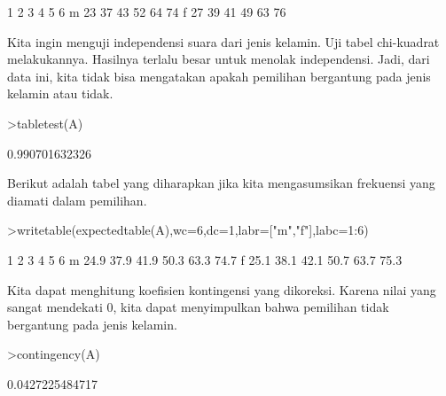 \documentclass[12pt,arial,letterpaper]{book}
\begin{document}
\begin{eulercomment}
\begin{eulercomment}
\begin{eulercomment}
\begin{eulercomment}
\begin{eulercomment}
\begin{eulercomment}
\begin{eulercomment}
\begin{eulercomment}
\begin{eulercomment}
\begin{eulercomment}
\begin{eulercomment}
\begin{eulercomment}
\begin{eulercomment}
\begin{eulercomment}
\begin{eulercomment}
\begin{eulercomment}
\begin{eulercomment}
\begin{eulercomment}
\begin{eulercomment}
\begin{eulercomment}
\begin{eulercomment}
\begin{eulercomment}
\begin{eulercomment}
\begin{eulercomment}
\begin{eulercomment}
\begin{eulercomment}
\begin{eulercomment}
\begin{eulercomment}
\begin{eulercomment}
\begin{eulercomment}
\begin{eulercomment}
\begin{eulercomment}
\begin{euleroutput}
             1     2     3     4     5     6
       m    23    37    43    52    64    74
       f    27    39    41    49    63    76
\end{euleroutput}
\begin{eulercomment}
Kita ingin menguji independensi suara dari jenis kelamin. Uji tabel
chi-kuadrat melakukannya. Hasilnya terlalu besar untuk menolak
independensi. Jadi, dari data ini, kita tidak bisa mengatakan apakah
pemilihan bergantung pada jenis kelamin atau tidak.
\end{eulercomment}
\begin{eulerprompt}
>tabletest(A)
\end{eulerprompt}
\begin{euleroutput}
  0.990701632326
\end{euleroutput}
\begin{eulercomment}
Berikut adalah tabel yang diharapkan jika kita mengasumsikan frekuensi
yang diamati dalam pemilihan.
\end{eulercomment}
\begin{eulerprompt}
>writetable(expectedtable(A),wc=6,dc=1,labr=["m","f"],labc=1:6)
\end{eulerprompt}
\begin{euleroutput}
             1     2     3     4     5     6
       m  24.9  37.9  41.9  50.3  63.3  74.7
       f  25.1  38.1  42.1  50.7  63.7  75.3
\end{euleroutput}
\begin{eulercomment}
Kita dapat menghitung koefisien kontingensi yang dikoreksi. Karena
nilai yang sangat mendekati 0, kita dapat menyimpulkan bahwa pemilihan
tidak bergantung pada jenis kelamin.
\end{eulercomment}
\begin{eulerprompt}
>contingency(A)
\end{eulerprompt}
\begin{euleroutput}
  0.0427225484717
\end{euleroutput}

\end{eulercomment}
\end{eulercomment}
\end{eulercomment}
\end{eulercomment}
\end{eulercomment}
\end{eulercomment}
\end{eulercomment}
\end{eulercomment}
\end{eulercomment}
\end{eulercomment}
\end{eulercomment}
\end{eulercomment}
\end{eulercomment}
\end{eulercomment}
\end{eulercomment}
\end{eulercomment}
\end{eulercomment}
\end{eulercomment}
\end{eulercomment}
\end{eulercomment}
\end{eulercomment}
\end{eulercomment}
\end{eulercomment}
\end{eulercomment}
\end{eulercomment}
\end{eulercomment}
\end{eulercomment}
\end{eulercomment}
\end{eulercomment}
\end{eulercomment}
\end{eulercomment}
\end{eulercomment}
\end{document}
